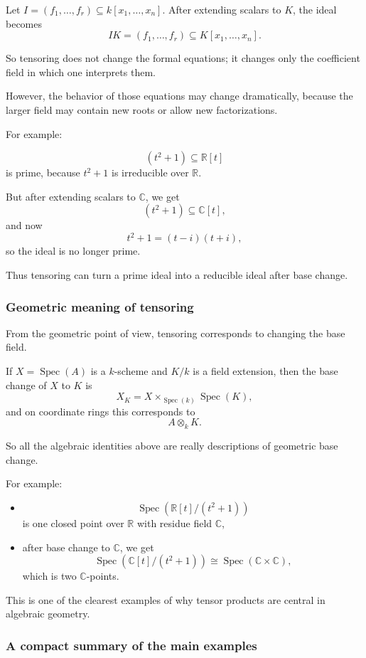 \documentclass[12pt,a4paper]{article}
\theoremstyle{notespace}
\newcommand{\Spec}{\operatorname{Spec}}
\theoremstyle{definition}
\begin{document}
Let \(I=(f_1,\dots,f_r)\subseteq k[x_1,\dots,x_n]\).  
After extending scalars to \(K\), the ideal becomes
\[
IK=(f_1,\dots,f_r)\subseteq K[x_1,\dots,x_n].
\]

So tensoring does not change the formal equations; it changes only the coefficient field in which one interprets them.

However, the behavior of those equations may change dramatically, because the larger field may contain new roots or allow new factorizations.

For example:

\[
(t^2+1)\subseteq \mathbb{R}[t]
\]
is prime, because \(t^2+1\) is irreducible over \(\mathbb{R}\).

But after extending scalars to \(\mathbb{C}\), we get
\[
(t^2+1)\subseteq \mathbb{C}[t],
\]
and now
\[
t^2+1=(t-i)(t+i),
\]
so the ideal is no longer prime.

Thus tensoring can turn a prime ideal into a reducible ideal after base change.

\subsubsection{Geometric meaning of tensoring}

From the geometric point of view, tensoring corresponds to changing the base field.

If \(X=\Spec(A)\) is a \(k\)-scheme and \(K/k\) is a field extension, then the base change of \(X\) to \(K\) is
\[
X_K = X\times_{\Spec(k)} \Spec(K),
\]
and on coordinate rings this corresponds to
\[
A\otimes_k K.
\]

So all the algebraic identities above are really descriptions of geometric base change.

For example:

\begin{itemize}
	\item
	\[
	\Spec(\mathbb{R}[t]/(t^2+1))
	\]
	is one closed point over \(\mathbb{R}\) with residue field \(\mathbb{C}\),
	
	\item after base change to \(\mathbb{C}\), we get
	\[
	\Spec(\mathbb{C}[t]/(t^2+1))
	\cong
	\Spec(\mathbb{C}\times \mathbb{C}),
	\]
	which is two \(\mathbb{C}\)-points.
\end{itemize}

This is one of the clearest examples of why tensor products are central in algebraic geometry.

\subsubsection{A compact summary of the main examples}
\end{document}
